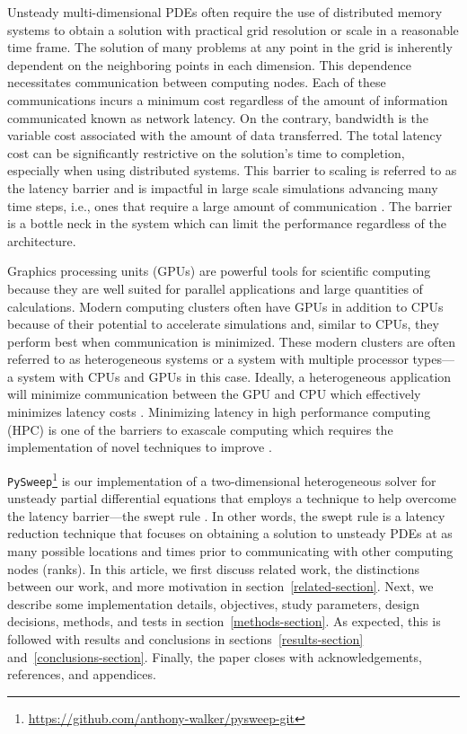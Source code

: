 \documentclass[review]{elsarticle}
\def\github{https://github.com/walkanth/pysweep}
\def\github{\url{https://github.com/anthony-walker/pysweep-git}}
\def\pysweep{\texttt{PySweep}}
\begin{document}
Unsteady multi-dimensional PDEs often require the use of distributed memory systems to obtain a solution with practical grid resolution or scale in a reasonable time frame. The solution of many problems at any point in the grid is inherently dependent on the neighboring points in each dimension. This dependence necessitates communication between computing nodes. Each of these communications incurs a minimum cost regardless of the amount of information communicated known as network latency. On the contrary, bandwidth is the variable cost associated with the amount of data transferred. The total latency cost can be significantly restrictive on the solution's time to completion, especially when using distributed systems. This barrier to scaling is referred to as the latency barrier and is impactful in large scale simulations advancing many time steps, i.e., ones that require a large amount of communication \cite{Alhubail2016ThePDEs}. The barrier is a bottle neck in the system which can limit the performance regardless of the architecture.

\par
Graphics processing units (GPUs) are powerful tools for scientific computing because they are well suited for parallel applications and large quantities of calculations. Modern computing clusters often have GPUs in addition to CPUs because of their potential to accelerate simulations and, similar to CPUs, they perform best when communication is minimized. These modern clusters are often referred to as heterogeneous systems or a system with multiple processor types---a system with CPUs and GPUs in this case. Ideally, a heterogeneous application will minimize communication between the GPU and CPU which effectively minimizes latency costs \cite{OanceaGPGPUCOMPUTING}. Minimizing latency in high performance computing (HPC) is one of the barriers to exascale computing which requires the implementation of novel techniques to improve \cite{Alexandrov2016RouteSkills}.

\par
\pysweep{}\footnote{\github} is our implementation of a two-dimensional heterogeneous solver for unsteady partial differential equations that employs a technique to help overcome the latency barrier---the swept rule \cite{Alhubail2016ThePDEs}. In other words, the swept rule is a latency reduction technique that focuses on obtaining a solution to unsteady PDEs at as many possible locations and times prior to communicating with other computing nodes (ranks). In this article, we first discuss related work, the distinctions between our work, and more motivation in section~\ref{related-section}. Next, we describe some implementation details, objectives, study parameters, design decisions, methods, and tests in section~\ref{methods-section}. As expected, this is followed with results and conclusions in sections~\ref{results-section} and~\ref{conclusions-section}. Finally, the paper closes with acknowledgements, references, and appendices.
\end{document}
